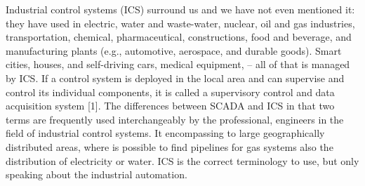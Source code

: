 \documentclass[conference]{IEEEtran}
\begin{document}
  Industrial control systems (ICS) surround us and we have not even mentioned it: they have used in electric, water and waste-water, nuclear, oil and gas industries, transportation, chemical, pharmaceutical, constructions, food and beverage, and manufacturing plants (e.g., automotive, aerospace, and durable goods). Smart cities, houses, and self-driving cars, medical equipment,  – all of that is managed by ICS.
If a control system is deployed in the local area and can supervise and control its individual components, it is called a supervisory control and data acquisition system [1]. The differences between SCADA and ICS in that two terms are frequently used interchangeably by the professional, engineers in the field of industrial control systems. It encompassing to large geographically distributed areas, where is possible to find pipelines for gas systems also the distribution of electricity or water. ICS is the correct terminology to use, but only speaking about the industrial automation.
\end{document}
